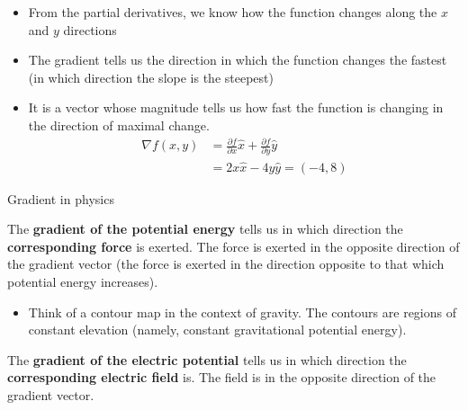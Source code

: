 \documentclass[aspectratio=169,
hyperref={colorlinks,urlcolor=blue}
]{beamer}
\begin{document}
{
\begin{itemize}
\item From the partial derivatives, we know how the function changes along the $x$ and $y$ directions
\item The gradient tells us the direction in which the function changes the fastest (in which direction the slope is the steepest)
\item It is a vector whose magnitude tells us how fast the function is changing in the direction of maximal change.
\begin{align*}
\nabla f(x,y) &= \frac{\partial f}{\partial x} \hat x + \frac{\partial f}{\partial y}\hat y\\
&=2x\hat x - 4y \hat y = (-4,8)
\end{align*}
\end{itemize}
}
{
}


\begin{bulletframe}{Gradient in physics}
\item The \textbf{gradient of the potential energy} tells us in which direction the \textbf{corresponding force} is exerted. The force is exerted in the opposite direction of the gradient vector (the force is exerted in the direction opposite to that which potential energy increases).
\begin{itemize}
\item Think of a contour map in the context of gravity. The contours are regions of constant elevation (namely, constant gravitational potential energy).
\end{itemize}
\item The \textbf{gradient of the electric potential} tells us in which direction the \textbf{corresponding electric field} is. The field is in the opposite direction of  the gradient vector.
\end{bulletframe}
\end{document}
